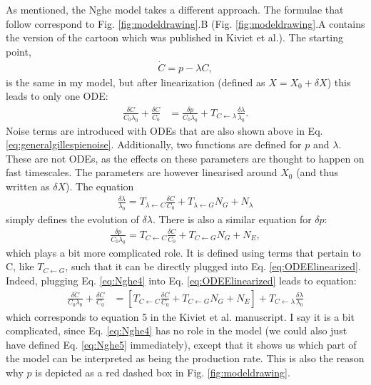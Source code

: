 As mentioned, the Nghe model takes a different approach. 
The formulae that follow correspond to Fig. \ref{fig:modeldrawing}.B (Fig. \ref{fig:modeldrawing}.A contains the version of the cartoon which was published in Kiviet et al.).
The starting point,
%
\begin{align}
\label{eq:Nghe1}
\dot{C} = p - \lambda C
,
\end{align}
%
is the same in my model, but after linearization (defined as $X=X_0+\delta X$) this leads to only one ODE:
%
\begin{align}
\label{eq:ODEElinearized}
\frac{ \delta{\dot{C}} }{C_0 \lambda_0} 
+ \frac{\delta C}{C_0} 
& =
\frac{\delta p}{C_0 \lambda_0} + T_{C \leftarrow \lambda} \frac{\delta \lambda}{\lambda_0}
.
\end{align}
%
Noise terms are introduced with ODEs that are also shown above in Eq. \ref{eq:generalgillespienoise}.
 Additionally, two functions are defined for $p$ and $\lambda$. These are not ODEs, as the effects on these parameters are thought to happen on fast timescales. The parameters are however linearised around $X_0$ (and thus written as $\delta X$). The equation
%
\begin{align}
\label{eq:Nghe3}
\frac{\delta\lambda}{\lambda_0} = T_{\lambda \leftarrow C} \frac{\delta C}{C_0} + T_{\lambda \leftarrow G} N_G + N_\lambda
\end{align}
%
simply defines the evolution of $\delta \lambda$.
There is also a similar equation for $\delta p$:
%
\begin{align}
\label{eq:Nghe4}
\frac{\delta{p}}{C_0 \lambda_0} = T_{C \leftarrow C} \frac{\delta C}{C_0} + T_{C \leftarrow G} N_G + N_E
,
\end{align}
%
which plays a bit more complicated role.
It is defined using terms that pertain to C, like $T_{C \leftarrow G}$, such that it can be directly plugged into Eq. \ref{eq:ODEElinearized}. 
Indeed, plugging Eq. \ref{eq:Nghe4} into Eq. \ref{eq:ODEElinearized} leads to equation:
%
\begin{align}
\label{eq:Nghe5}
\frac{ \delta{\dot{C}} }{C_0 \lambda_0} 
+ \frac{\delta C}{C_0} 
& = 
\left[
 T_{C \leftarrow C} \frac{\delta C}{C_0} + T_{C \leftarrow G} N_G + N_E 
 \right]
 + T_{C \leftarrow \lambda} \frac{\delta \lambda}{\lambda_0} 
\end{align}
%
which corresponds to equation 5 in the Kiviet et al. \cite{Kiviet2014} manuscript.
I say it is a bit complicated, since Eq. \ref{eq:Nghe4} has no role in the model (we could also just have defined Eq. \ref{eq:Nghe5} immediately), except that it shows us which part of the model can be interpreted as being the production rate.
This is also the reason why $p$ is depicted as a red dashed box in Fig. \ref{fig:modeldrawing}.


